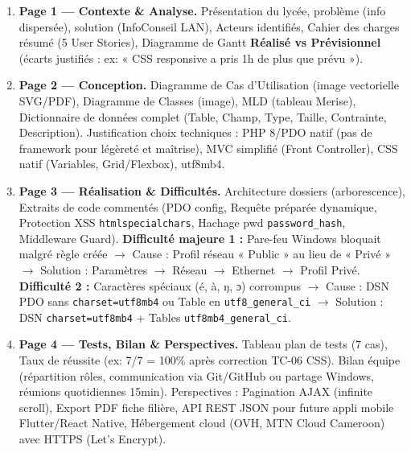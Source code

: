 \documentclass[11pt]{article}
\begin{document}
\begin{definition}
\begin{enumerate}
    \item \textbf{Page 1 — Contexte \& Analyse.} Présentation du lycée, problème (info dispersée), solution (InfoConseil LAN), Acteurs identifiés, Cahier des charges résumé (5 User Stories), Diagramme de Gantt \textbf{Réalisé vs Prévisionnel} (écarts justifiés : ex: « CSS responsive a pris 1h de plus que prévu »).
    \item \textbf{Page 2 — Conception.} Diagramme de Cas d'Utilisation (image vectorielle SVG/PDF), Diagramme de Classes (image), MLD (tableau Merise), Dictionnaire de données complet (Table, Champ, Type, Taille, Contrainte, Description). Justification choix techniques : PHP 8/PDO natif (pas de framework pour légèreté et maîtrise), MVC simplifié (Front Controller), CSS natif (Variables, Grid/Flexbox), utf8mb4.
    \item \textbf{Page 3 — Réalisation \& Difficultés.} Architecture dossiers (arborescence), Extraits de code commentés (PDO config, Requête préparée dynamique, Protection XSS \texttt{htmlspecialchars}, Hachage pwd \texttt{password\_hash}, Middleware Guard). \textbf{Difficulté majeure 1 :} Pare-feu Windows bloquait malgré règle créée $\to$ Cause : Profil réseau « Public » au lieu de « Privé » $\to$ Solution : Paramètres $\to$ Réseau $\to$ Ethernet $\to$ Profil Privé. \textbf{Difficulté 2 :} Caractères spéciaux (é, à, ŋ, ɔ) corrompus $\to$ Cause : DSN PDO sans \texttt{charset=utf8mb4} ou Table en \texttt{utf8\_general\_ci} $\to$ Solution : DSN \texttt{charset=utf8mb4} + Tables \texttt{utf8mb4\_general\_ci}.
    \item \textbf{Page 4 — Tests, Bilan \& Perspectives.} Tableau plan de tests (7 cas), Taux de réussite (ex: 7/7 = 100\% après correction TC-06 CSS). Bilan équipe (répartition rôles, communication via Git/GitHub ou partage Windows, réunions quotidiennes 15min). Perspectives : Pagination AJAX (infinite scroll), Export PDF fiche filière, API REST JSON pour future appli mobile Flutter/React Native, Hébergement cloud (OVH, MTN Cloud Cameroon) avec HTTPS (Let's Encrypt).
\end{enumerate}
\end{definition}
\end{document}
